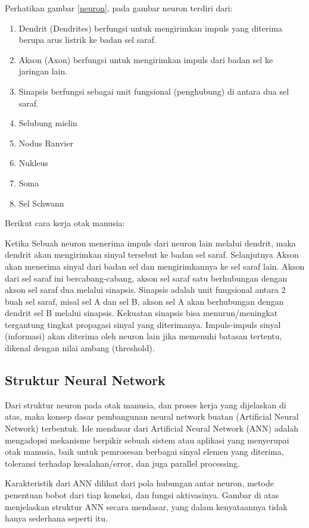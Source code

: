 Perhatikan gambar \ref{neuron}, pada gambar neuron terdiri dari:

\begin{enumerate}
\item Dendrit (Dendrites) berfungsi untuk mengirimkan impuls yang diterima berupa arus listrik ke badan sel saraf.
\item Akson (Axon) berfungsi untuk mengirimkan impuls dari badan sel ke jaringan lain.
\item Sinapsis berfungsi sebagai unit fungsional (penghubung) di antara dua sel saraf.
\item Selubung mielin
\item Nodus Ranvier
\item Nukleus
\item Soma
\item Sel Schwann
\end{enumerate}

Berikut cara kerja otak manusia:

Ketika Sebuah neuron menerima impuls dari neuron lain melalui dendrit, maka dendrit akan mengirimkan sinyal tersebut ke badan sel saraf. Selanjutnya Akson akan menerima sinyal dari badan sel dan mengirimkannya ke sel saraf lain. Akson dari sel saraf ini bercabang-cabang, akson sel saraf satu berhubungan dengan akson sel saraf dua melalui sinapsis. Sinapsis adalah unit fungsional antara 2 buah sel saraf, misal sel A dan sel B, akson sel A akan berhubungan dengan dendrit sel B melalui sinapsis. Kekuatan sinapsis bisa menurun/meningkat tergantung tingkat propagasi sinyal yang diterimanya. Impuls-impuls sinyal (informasi) akan diterima oleh neuron lain jika memenuhi batasan tertentu, dikenal dengan nilai ambang (threshold).

\subsection{Struktur Neural Network}
Dari struktur neuron pada otak manusia, dan proses kerja yang dijelaskan di atas, maka konsep dasar pembangunan neural network buatan (Artificial Neural Network) terbentuk. Ide mendasar dari Artificial Neural Network (ANN) adalah mengadopsi mekanisme berpikir sebuah sistem atau aplikasi yang menyerupai otak manusia, baik untuk pemrosesan berbagai sinyal elemen yang diterima, toleransi terhadap kesalahan/error, dan juga parallel processing.

Karakteristik dari ANN dilihat dari pola hubungan antar neuron, metode penentuan bobot dari tiap koneksi, dan fungsi aktivasinya. Gambar di atas menjelaskan struktur ANN secara mendasar, yang dalam kenyataannya tidak hanya sederhana seperti itu.

